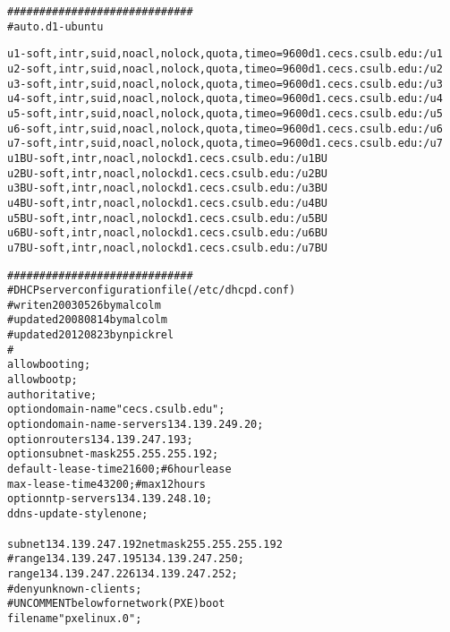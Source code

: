\begin{alltt}
#############################
#auto.d1 - ubuntu

u1 -soft,intr,suid,noacl,nolock,quota,timeo=9600 d1.cecs.csulb.edu:/u1
u2 -soft,intr,suid,noacl,nolock,quota,timeo=9600 d1.cecs.csulb.edu:/u2
u3 -soft,intr,suid,noacl,nolock,quota,timeo=9600 d1.cecs.csulb.edu:/u3
u4 -soft,intr,suid,noacl,nolock,quota,timeo=9600 d1.cecs.csulb.edu:/u4
u5 -soft,intr,suid,noacl,nolock,quota,timeo=9600 d1.cecs.csulb.edu:/u5
u6 -soft,intr,suid,noacl,nolock,quota,timeo=9600 d1.cecs.csulb.edu:/u6
u7 -soft,intr,suid,noacl,nolock,quota,timeo=9600 d1.cecs.csulb.edu:/u7
u1BU -soft,intr,noacl,nolock d1.cecs.csulb.edu:/u1BU
u2BU -soft,intr,noacl,nolock d1.cecs.csulb.edu:/u2BU
u3BU -soft,intr,noacl,nolock d1.cecs.csulb.edu:/u3BU
u4BU -soft,intr,noacl,nolock d1.cecs.csulb.edu:/u4BU
u5BU -soft,intr,noacl,nolock d1.cecs.csulb.edu:/u5BU
u6BU -soft,intr,noacl,nolock d1.cecs.csulb.edu:/u6BU
u7BU -soft,intr,noacl,nolock d1.cecs.csulb.edu:/u7BU

#############################
# DHCP server configuration file (/etc/dhcpd.conf)
# writen 20030526 by malcolm
# updated 20080814 by malcolm
# updated 20120823 by npickrel
# 	
allow booting;
allow bootp;
authoritative;
option domain-name "cecs.csulb.edu";
option domain-name-servers 134.139.249.20;
option routers 134.139.247.193;
option subnet-mask 255.255.255.192;
default-lease-time 21600; # 6 hour lease
max-lease-time 43200;     # max 12 hours
option ntp-servers 134.139.248.10;
ddns-update-style none;

  subnet 134.139.247.192 netmask 255.255.255.192 {
    #range 134.139.247.195 134.139.247.250;
    range 134.139.247.226 134.139.247.252;
    #deny unknown-clients;
    # UNCOMMENT below for network (PXE)boot
    filename "pxelinux.0";
}

\end{alltt}
